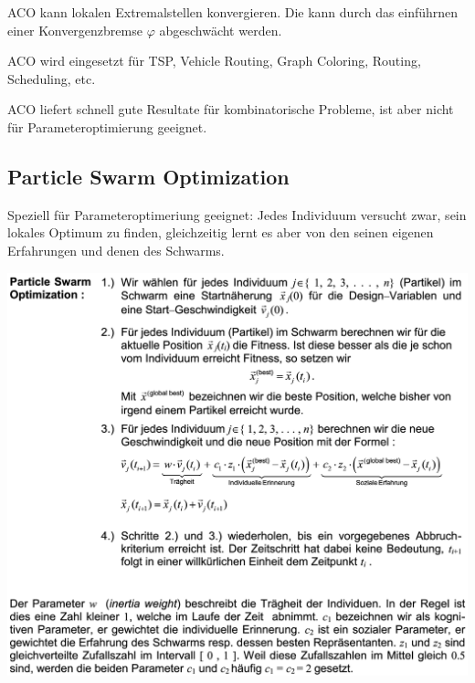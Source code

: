   ACO kann lokalen Extremalstellen konvergieren. Die kann durch das einführnen einer Konvergenzbremse $\varphi$ abgeschwächt werden.
  
  ACO wird eingesetzt für TSP, Vehicle Routing, Graph Coloring, Routing, Scheduling, etc.
  
  ACO liefert schnell gute Resultate für kombinatorische Probleme, ist aber nicht für Parameteroptimierung geeignet.\\
  
  
  
\subsection{Particle Swarm Optimization }
  Speziell für Parameteroptimeriung geeignet: Jedes Individuum versucht zwar, sein lokales Optimum zu finden, gleichzeitig lernt es aber von den seinen eigenen Erfahrungen und denen des Schwarms.
  
  \begin{center}
  \includegraphics[width=0.7\linewidth]{./Content/MetaHeuristics/partSwarm}
  \end{center}

\newpage
  
  
  

